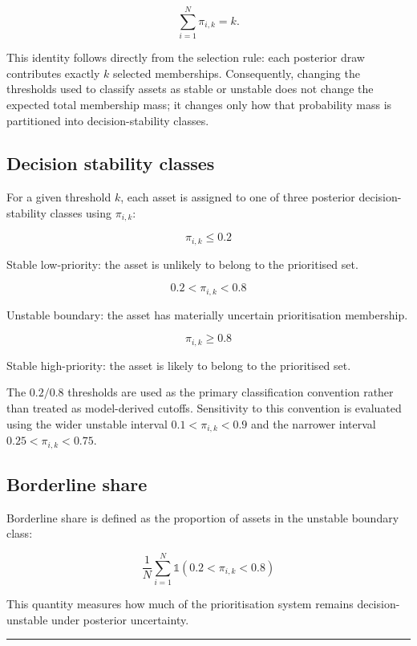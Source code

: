 \documentclass[
]{article}
\begin{document}
\[
\sum_{i=1}^{N} \pi_{i,k} = k.
\]

This identity follows directly from the selection rule: each posterior
draw contributes exactly \(k\) selected memberships. Consequently,
changing the thresholds used to classify assets as stable or unstable
does not change the expected total membership mass; it changes only how
that probability mass is partitioned into decision-stability classes.

\subsection{Decision stability
classes}\label{decision-stability-classes}

For a given threshold \(k\), each asset is assigned to one of three
posterior decision-stability classes using \(\pi_{i,k}\):

\[
\pi_{i,k} \leq 0.2
\]

Stable low-priority: the asset is unlikely to belong to the prioritised
set.

\[
0.2 < \pi_{i,k} < 0.8
\]

Unstable boundary: the asset has materially uncertain prioritisation
membership.

\[
\pi_{i,k} \geq 0.8
\]

Stable high-priority: the asset is likely to belong to the prioritised
set.

The \(0.2/0.8\) thresholds are used as the primary classification
convention rather than treated as model-derived cutoffs. Sensitivity to
this convention is evaluated using the wider unstable interval
\(0.1 < \pi_{i,k} < 0.9\) and the narrower interval
\(0.25 < \pi_{i,k} < 0.75\).

\subsection{Borderline share}\label{borderline-share}

Borderline share is defined as the proportion of assets in the unstable
boundary class:

\[
\frac{1}{N}\sum_{i=1}^{N}
\mathbb{1}
\left(
0.2 < \pi_{i,k} < 0.8
\right)
\]

This quantity measures how much of the prioritisation system remains
decision-unstable under posterior uncertainty.

\begin{center}\rule{0.5\linewidth}{0.5pt}\end{center}
\end{document}
